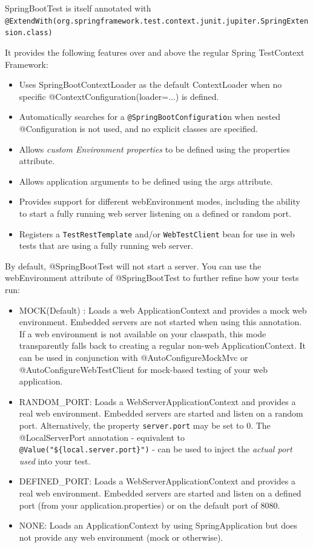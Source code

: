 \documentclass{scrartcl}
\begin{document}
SpringBootTest is itself annotated with
\lstinline|@ExtendWith(org.springframework.test.context.junit.jupiter.SpringExtension.class)|

It provides the following features over and above the regular Spring TestContext Framework:

\begin{itemize}
    \item Uses SpringBootContextLoader as the default ContextLoader when no specific @ContextConfiguration(loader=...) is defined.
    \item Automatically searches for a \lstinline|@SpringBootConfiguratio|n when nested @Configuration is not used, and no explicit classes are specified.
    \item Allows \textit{custom Environment properties} to be defined using the properties attribute.
    \item Allows application arguments to be defined using the args attribute.
    \item Provides support for different webEnvironment modes, including the ability to start a fully running web server listening on a defined or random port.
    \item Registers a \lstinline|TestRestTemplate| and/or \lstinline|WebTestClient| bean for use in web tests that are using a fully running web server.
\end{itemize}


By default, @SpringBootTest will not start a server. You can use the webEnvironment attribute of @SpringBootTest to further refine how your tests run:

\begin{itemize}
    \item MOCK(Default) : Loads a web ApplicationContext and provides a mock web environment. Embedded servers are not started when using this annotation. If a web environment is not available on your classpath, this mode transparently falls back to creating a regular non-web ApplicationContext. It can be used in conjunction with @AutoConfigureMockMvc or @AutoConfigureWebTestClient for mock-based testing of your web application.

    \item RANDOM\_PORT: Loads a WebServerApplicationContext and provides a real web environment. Embedded servers are started and listen on a random port.
    Alternatively, the property \lstinline|server.port| may be set to 0.
    The @LocalServerPort annotation - equivalent to  \lstinline|@Value("${local.server.port}")| - can be used to inject the \textit{actual port used} into your test.

    \item DEFINED\_PORT: Loads a WebServerApplicationContext and provides a real web environment. Embedded servers are started and listen on a defined port (from your application.properties) or on the default port of 8080.

    \item NONE: Loads an ApplicationContext by using SpringApplication but does not provide any web environment (mock or otherwise).
\end{itemize}
\end{document}
